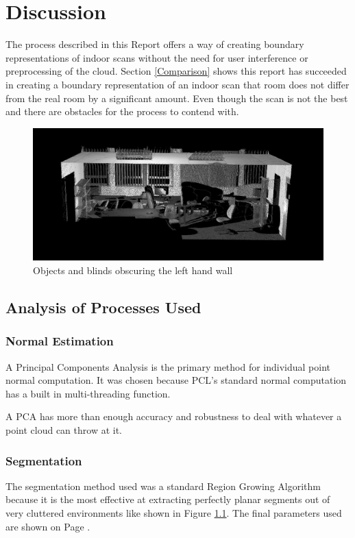 \chapter{Discussion}
	\label{discussion}
	The process described in this Report offers a way of creating boundary representations of indoor scans without the need for user interference or preprocessing of the cloud. Section \ref{Comparison} shows this report has succeeded in creating a boundary representation of an indoor scan that room does not differ from the real room by a significant amount. Even though the scan is not the best and there are obstacles for the process to contend with. 
	
	\begin{figure}[H]
	\centering
	\includegraphics[width=0.9\linewidth]{"Includes/images/Results/Messy Wall"}
	\caption{Objects and blinds obscuring the left hand wall}
	\label{fig:MessyWall}
	\end{figure}
	
	\section{Analysis of Processes Used}
		\subsection{Normal Estimation}
			A Principal Components Analysis is the primary method for individual point normal computation. It was chosen because PCL's standard normal computation has a built in multi-threading function.
			
			A PCA has more than enough accuracy and robustness to deal with whatever a point cloud can throw at it.
			
		\subsection{Segmentation}
			The segmentation method used was a standard Region Growing Algorithm because it is the most effective at extracting perfectly planar segments out of very cluttered environments like shown in Figure \ref{fig:MessyWall}. The final parameters used are shown on Page \pageref{RGParams}.
		
